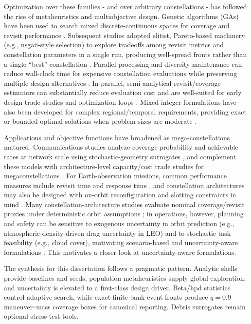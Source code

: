     Optimization over these families - and over arbitrary constellations - has followed the rise of metaheuristics and multiobjective design. Genetic algorithms (GAs) have been used to search mixed discrete-continuous spaces for coverage and revisit performance \cite{ely1999GA,williams2001MOGA}. Subsequent studies adopted elitist, Pareto-based machinery (e.g., \gls{nsgaii}-style selection) to explore tradeoffs among revisit metrics and constellation parameters in a single run, producing well-spread fronts rather than a single ``best'' constellation \cite{williams2001MOGA,ferringer2006jsr,deb2002nsgaii}. Parallel processing and diversity maintenance can reduce wall-clock time for expensive constellation evaluations while preserving multiple design alternatives \cite{ferringer2007jsr}. In parallel, semi-analytical revisit/coverage estimators can substantially reduce evaluation cost and are well-suited for early design trade studies and optimization loops \cite{crisp2018revisit}. Mixed-integer formulations have also been developed for complex regional/temporal requirements, providing exact or bounded-optimal solutions when problem sizes are moderate \cite{lee2019ilp}.
    
    Applications and objective functions have broadened as mega-constellations matured. Communications studies analyze coverage probability and achievable rates at network scale using stochastic-geometry surrogates \cite{okati2020stochgeom}, and complement these models with architecture-level capacity/cost trade studies for megaconstellations \cite{delportillo2023comms}. For Earth-observation missions, common performance measures include revisit time and response time \cite{SahSrivastavaDas2021}, and constellation architectures may also be designed with on-orbit reconfiguration and slotting constraints in mind \cite{ArnasLinares2021}. Many constellation-architecture studies evaluate nominal coverage/revisit proxies under deterministic orbit assumptions \cite{ely1999GA,williams2001MOGA,ferringer2006jsr}; in operations, however, planning and safety can be sensitive to exogenous uncertainty in orbit prediction (e.g., atmospheric-density-driven drag uncertainty in LEO) and to stochastic task feasibility (e.g., cloud cover), motivating scenario-based and uncertainty-aware formulations \cite{EddyKochenderfer2019,GondelachLinares2019,NormanRivest2024}. This motivates a closer look at uncertainty-aware formulations.
    
    The synthesis for this dissertation follows a pragmatic pattern. Analytic shells provide baselines and seeds; population metaheuristics supply global exploration; and uncertainty is elevated to a first-class design driver. Beta/\gls{hpd} statistics control adaptive search, while exact finite-bank event fronts produce \(q=0.9\) maneuver--mass coverage boxes for canonical reporting. Debris surrogates remain optional stress-test tools.

